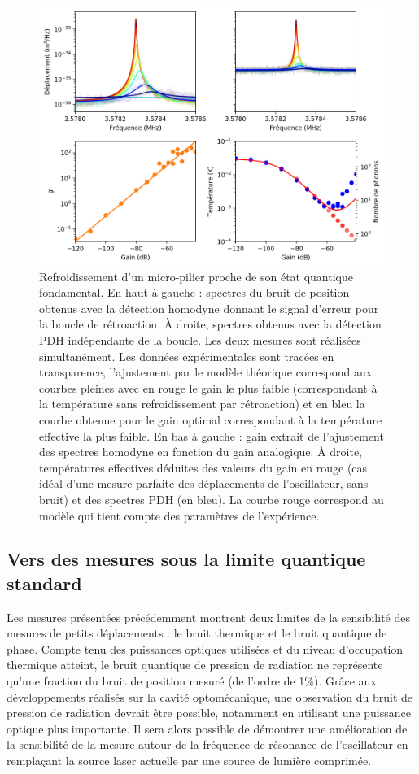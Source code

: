 \documentclass[12pt,a4paper]{article}
\begin{document}
\begin{figure}
\center
\includegraphics[scale=0.75]{figures/feedback_cooling_6phonons_defense_with_gain_all.png}
\caption{Refroidissement d'un micro-pilier proche de son état quantique fondamental.
En haut à gauche : spectres du bruit de position obtenus avec la détection homodyne donnant le signal d'erreur pour la boucle de rétroaction.
À droite, spectres obtenus avec la détection PDH indépendante de la boucle.
Les deux mesures sont réalisées simultanément.
Les données expérimentales sont tracées en transparence, l'ajustement par le modèle théorique correspond aux courbes pleines avec en rouge le gain le plus faible (correspondant à la température sans refroidissement par rétroaction) et en bleu la courbe obtenue pour le gain optimal correspondant à la température effective la plus faible.
En bas à gauche : gain extrait de l'ajustement des spectres homodyne en fonction du gain analogique.
À droite, températures effectives déduites des valeurs du gain en rouge (cas idéal d'une mesure parfaite des déplacements de l'oscillateur, sans bruit) et des spectres PDH (en bleu).
La courbe rouge correspond au modèle qui tient compte des paramètres de l'expérience.}
\label{fig:feedback_cooling_pillar}
\end{figure}

\subsection{Vers des mesures sous la limite quantique standard}

Les mesures présentées précédemment montrent deux limites de la sensibilité des mesures de petits déplacements : le bruit thermique et le bruit quantique de phase.
Compte tenu des puissances optiques utilisées et du niveau d'occupation thermique atteint, le bruit quantique de pression de radiation ne représente qu'une fraction du bruit de position mesuré (de l'ordre de \unit{1}{\%}).
Grâce aux développements réalisés sur la cavité optomécanique, une observation du bruit de pression de radiation devrait être possible, notamment en utilisant une puissance optique plus importante.
Il sera alors possible de démontrer une amélioration de la sensibilité de la mesure autour de la fréquence de résonance de l'oscillateur en remplaçant la source laser actuelle par une source de lumière comprimée.
\end{document}
